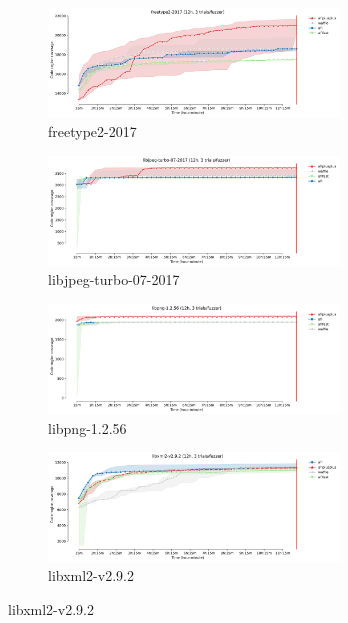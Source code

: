 \begin{figure}
    \centering
    \begin{subfigure}[t]{\textwidth}
        \centering
        \includegraphics[width=0.85\textwidth]{Experiments/freetype2-2017_coverage_growth.png}
        \caption{freetype2-2017}
        \label{fig:sub:freetype-cov-growth}
    \end{subfigure}

    \begin{subfigure}[t]{\textwidth}
        \centering
        \includegraphics[width=0.85\textwidth]{Experiments/libjpeg-turbo-07-2017_coverage_growth.png}
        \caption{libjpeg-turbo-07-2017}
        \label{fig:sub:libjpeg-cov-growth}
    \end{subfigure}

    \begin{subfigure}[t]{\textwidth}
        \centering
        \includegraphics[width=0.85\textwidth]{Experiments/libpng-1.2.56_coverage_growth.png}
        \caption{libpng-1.2.56}
        \label{fig:sub:libpng-cov-growth}
    \end{subfigure}

    \begin{subfigure}[t]{\textwidth}
        \centering
        \includegraphics[width=0.85\textwidth]{Experiments/libxml2-v2.9.2_coverage_growth.png}
        \caption{libxml2-v2.9.2}
        \label{fig:sub:libxml-cov-growth}
    \end{subfigure}


\end{figure}
